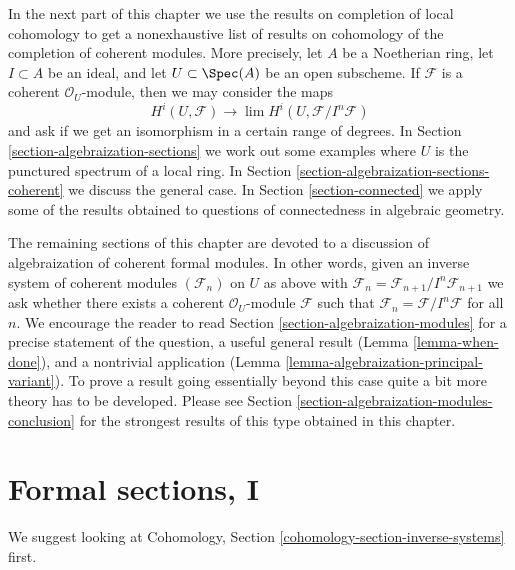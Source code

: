 \medskip\noindent
In the next part of this chapter we use the results on
completion of local cohomology to get a nonexhaustive list of results on
cohomology of the completion of coherent modules.
More precisely, let $A$ be a Noetherian ring, let $I \subset A$
be an ideal, and let $U \subset \Spec(A)$ be an open subscheme.
If $\mathcal{F}$ is a coherent $\mathcal{O}_U$-module, then
we may consider the maps
$$
H^i(U, \mathcal{F}) \longrightarrow \lim H^i(U, \mathcal{F}/I^n\mathcal{F})
$$
and ask if we get an isomorphism in a certain range of degrees.
In Section \ref{section-algebraization-sections}
we work out some examples where $U$ is the punctured spectrum
of a local ring. In Section \ref{section-algebraization-sections-coherent}
we discuss the general case.
In Section \ref{section-connected} we apply some of the results
obtained to questions of connectedness in algebraic geometry.

\medskip\noindent
The remaining sections of this chapter are devoted to a discussion
of algebraization of coherent formal modules. In other words, given
an inverse system of coherent modules $(\mathcal{F}_n)$ on $U$
as above with
$\mathcal{F}_n = \mathcal{F}_{n + 1}/I^n\mathcal{F}_{n + 1}$
we ask whether there exists a coherent $\mathcal{O}_U$-module
$\mathcal{F}$ such that
$\mathcal{F}_n = \mathcal{F}/I^n\mathcal{F}$
for all $n$. We encourage the reader to read
Section \ref{section-algebraization-modules}
for a precise statement of the question, a useful general result
(Lemma \ref{lemma-when-done}), and a nontrivial application
(Lemma \ref{lemma-algebraization-principal-variant}).
To prove a result going essentially beyond this case
quite a bit more theory has to be developed.
Please see Section \ref{section-algebraization-modules-conclusion}
for the strongest results of this type obtained in this chapter.



\section{Formal sections, I}
\label{section-ML-degree-zero}

\noindent
We suggest looking at
Cohomology, Section \ref{cohomology-section-inverse-systems} first.


